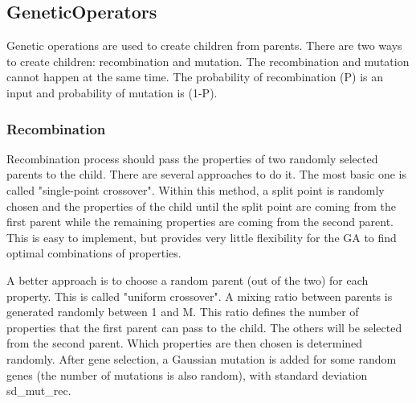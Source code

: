 \subsection{GeneticOperators} \label{geneticOperators}

Genetic operations are used to create children from parents. There are two ways to create children: recombination and mutation. The recombination and mutation cannot happen at the same time. The probability of recombination (P) is an input and probability of mutation is (1-P).

\subsubsection{Recombination}

Recombination process should pass the properties of two randomly selected parents to the child. There are several approaches to do it. The most basic one is called "single-point crossover". Within this method, a split point is randomly chosen and the properties of the child until the split point are coming from the first parent while the remaining properties are coming from the second parent. This is easy to implement, but provides very little flexibility for the GA to find optimal combinations of properties. %

A better approach is to choose a random parent (out of the two) for each property. This is called "uniform crossover". A mixing ratio between parents is generated randomly between 1 and M. This ratio defines the number of properties that the first parent can pass to the child. The others will be selected from the second parent. Which properties are then chosen is determined randomly. After gene selection, a Gaussian mutation is added for some random genes (the number of mutations is also random), with standard deviation sd_mut_rec.


